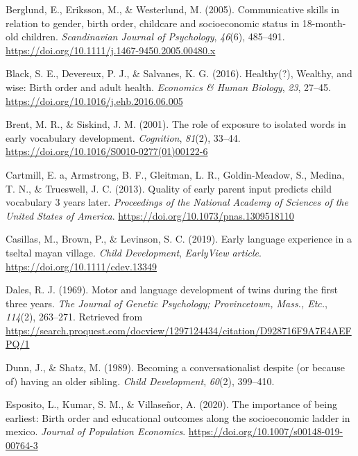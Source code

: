 \documentclass[
  english,
  man,floatsintext]{apa6}
\begin{document}
\leavevmode\hypertarget{ref-berglund_communicative_2005}{}%
Berglund, E., Eriksson, M., \& Westerlund, M. (2005). Communicative skills in relation to gender, birth order, childcare and socioeconomic status in 18-month-old children. \emph{Scandinavian Journal of Psychology}, \emph{46}(6), 485--491. \url{https://doi.org/10.1111/j.1467-9450.2005.00480.x}

\leavevmode\hypertarget{ref-black_healthy_2016}{}%
Black, S. E., Devereux, P. J., \& Salvanes, K. G. (2016). Healthy(?), Wealthy, and wise: Birth order and adult health. \emph{Economics \& Human Biology}, \emph{23}, 27--45. \url{https://doi.org/10.1016/j.ehb.2016.06.005}

\leavevmode\hypertarget{ref-brent_role_2001}{}%
Brent, M. R., \& Siskind, J. M. (2001). The role of exposure to isolated words in early vocabulary development. \emph{Cognition}, \emph{81}(2), 33--44. \url{https://doi.org/10.1016/S0010-0277(01)00122-6}

\leavevmode\hypertarget{ref-cartmill_quality_2013}{}%
Cartmill, E. a, Armstrong, B. F., Gleitman, L. R., Goldin-Meadow, S., Medina, T. N., \& Trueswell, J. C. (2013). Quality of early parent input predicts child vocabulary 3 years later. \emph{Proceedings of the National Academy of Sciences of the United States of America}. \url{https://doi.org/10.1073/pnas.1309518110}

\leavevmode\hypertarget{ref-casillas_early_2019}{}%
Casillas, M., Brown, P., \& Levinson, S. C. (2019). Early language experience in a tseltal mayan village. \emph{Child Development}, \emph{EarlyView article}. \url{https://doi.org/10.1111/cdev.13349}

\leavevmode\hypertarget{ref-dales_motor_1969}{}%
Dales, R. J. (1969). Motor and language development of twins during the first three years. \emph{The Journal of Genetic Psychology; Provincetown, Mass., Etc.}, \emph{114}(2), 263--271. Retrieved from \url{https://search.proquest.com/docview/1297124434/citation/D928716F9A7E4AEFPQ/1}

\leavevmode\hypertarget{ref-dunn_becoming_1989}{}%
Dunn, J., \& Shatz, M. (1989). Becoming a conversationalist despite (or because of) having an older sibling. \emph{Child Development}, \emph{60}(2), 399--410.

\leavevmode\hypertarget{ref-esposito_importance_2020}{}%
Esposito, L., Kumar, S. M., \& Villaseñor, A. (2020). The importance of being earliest: Birth order and educational outcomes along the socioeconomic ladder in mexico. \emph{Journal of Population Economics}. \url{https://doi.org/10.1007/s00148-019-00764-3}
\end{document}
